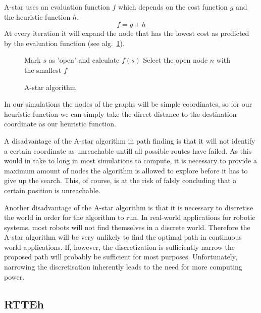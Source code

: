 \documentclass{report}
\begin{document}
			A-star uses an evaluation function $f$ which depends on the cost function $g$ and the heuristic function $h$.
			\begin{equation}
				\label{eq:astarevaluation}
			 	f = g + h
			\end{equation} 
			At every iteration it will expand the node that has the lowest cost as predicted by the evaluation function (see alg.~\ref{alg:astar}).
			\begin{figure}
			\begin{algorithm}[H]
				Mark $s$ as 'open' and calculate $f(s)$\;
				Select the open node $n$ with the smallest $f$\;
				\caption{A-star algorithm~\protect\cite{4082128}}
				\label{alg:astar}
			\end{algorithm}
			\end{figure}

			In our simulations the nodes of the graphs will be simple coordinates, so for our heuristic function we can simply take the direct distance to the destination coordinate as our heuristic function.

			A disadvantage of the A-star algorithm in path finding is that it will not identify a certain coordinate as unreachable untill all possible routes have failed. As this would in take to long in most simulations to compute, it is necessary to provide a maximum amount of nodes the algorithm is allowed to explore before it has to give up the search. This, of course, is at the risk of falsly concluding that a certain position is unreachable.

			Another disadvantage of the A-star algorithm is that it is necessary to discretise the world in order for the algorithm to run. In real-world applications for robotic systems, most robots will not find themselves in a discrete world. Therefore the A-star algorithm will be very unlikely to find the optimal path in continuous world applications. If, however, the discretization is sufficiently narrow the proposed path will probably be sufficient for most purposes. Unfortunately, narrowing the discretisation inherently leads to the need for more computing power.

		\subsection{RTTEh}
\end{document}
